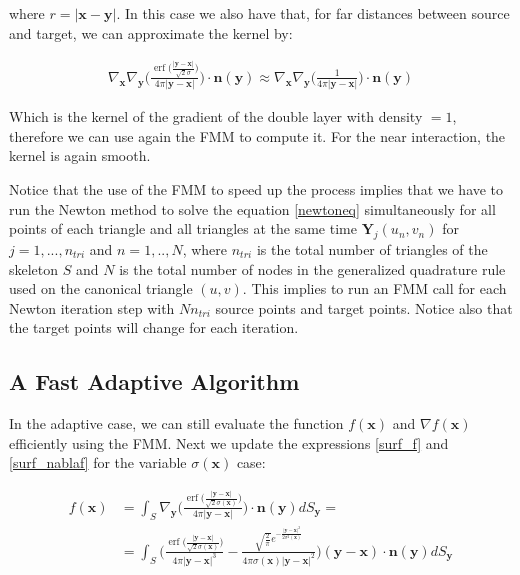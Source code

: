 \documentclass[11pt]{article}
\DeclareMathOperator\erf{erf}
\newcommand\bx{\boldsymbol x}
\newcommand\by{\boldsymbol y}
\newcommand\bn{\boldsymbol n}
\newcommand\bY{\boldsymbol Y}
\begin{document}
where $r=|\bx-\by|$. In this case we also have that, for far distances between source and target, we can approximate the kernel by:

\begin{equation}
\begin{aligned}
\nabla_{\bx}\nabla_{\by}\Big(\frac{\erf\big(\frac{|\by-\bx|}{\sqrt{2}\sigma}\big)}{4\pi|\by-\bx|}\Big)\cdot\bn(\by)\approx
\nabla_{\bx}\nabla_{\by}\Big(\frac{1}{4\pi|\by-\bx|}\Big)\cdot\bn(\by)
\end{aligned}
\end{equation}

Which is the kernel of the gradient of the double layer with density $=1$, therefore we can use again the FMM to compute it. For the near interaction, the kernel is again smooth.

Notice that the use of the FMM to speed up the process implies that we have to run the Newton method to solve the equation \ref{newtoneq} simultaneously for all points of each triangle and all triangles at the same time $\bY_j(u_n,v_n)$ for $j=1,...,n_{tri}$ and $n=1,..,N$, where $n_{tri}$ is the total number of triangles of the skeleton $\mathit{S}$ and $N$ is the total number of nodes in the generalized quadrature rule used on the canonical triangle $(u,v)$. This implies to run an FMM call for each Newton iteration step with $Nn_{tri}$ source points and target points. Notice also that the target points will change for each iteration.



\subsection{A Fast Adaptive Algorithm}
\label{sec:fast-adap}

In the adaptive case, we can still evaluate the function $f(\bx)$ and
$\nabla f(\bx)$ efficiently using the FMM. Next we update the
expressions \ref{surf_f} and \ref{surf_nablaf} for the variable
$\sigma(\bx)$ case:

 
\begin{equation}
\begin{aligned}
f(\bx)&=\int_{\mathit{S}}\nabla_{\by}\Big(\frac{\erf\big(\frac{|\by-\bx|}{\sqrt{2}\sigma(\bx)}\big)}{4\pi|\by-\bx|}\Big)\cdot\bn(\by)dS_{\by}=\\
&=\int_{\mathit{S}}\Bigg(\frac{\erf\big(\frac{|\by-\bx|}{\sqrt{2}\sigma(\bx)}\big)}{4\pi|\by-\bx|^3}-\frac{\sqrt{\frac{2}{\pi}}e^{-\frac{|\by-\bx|^2}{2\sigma^2(\bx)}}}{4\pi\sigma(\bx)|\by-\bx|^2}\Bigg)(\by-\bx)\cdot\bn(\by)dS_{\by}
\end{aligned}
\end{equation}
\end{document}
